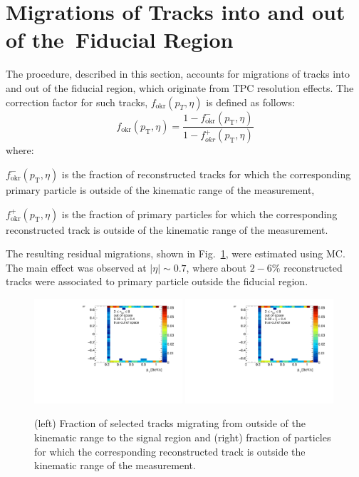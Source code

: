 \section{Migrations of Tracks into and out of the~Fiducial Region}\label{section:star_okr}
The procedure, described in this section, accounts for migrations of tracks into and out of the fiducial region, which originate from TPC resolution effects. The correction factor for such tracks, $f_\textrm{okr}(p_T, \eta)$ is defined as follows:
\begin{equation}
f_\textrm{okr}(p_\textrm{T}, \eta)=\frac{1-f_\textrm{okr}^-(p_\textrm{T}, \eta)}{1-f_{okr}^+(p_\textrm{T}, \eta)}
\end{equation}
where:
\begin{description}
	\item $f_\textrm{okr}^-(p_\textrm{T}, \eta)$ is the fraction of reconstructed tracks for which the corresponding primary particle is outside of the kinematic range of the measurement,
	\item $f_\textrm{okr}^+(p_\textrm{T}, \eta)$  is the fraction of primary particles for which the corresponding reconstructed track is outside of the kinematic range of the measurement.
\end{description}
The resulting residual migrations, shown in Fig.~\ref{fig:okr}, were estimated using MC. The main effect  was observed  at $|\eta| \sim 0.7$, where about $2-6\%$ reconstructed tracks were associated to primary particle outside the fiducial region.  

\begin{figure}[h!]
	\centering
	\includegraphics[width=0.49\textwidth, page=1]{chapters/chrgSTAR/img/OKR/outOfSpace.pdf}
	\includegraphics[width=0.49\textwidth, page=2]{chapters/chrgSTAR/img/OKR/outOfSpace.pdf}
	\caption{(left) Fraction of selected tracks migrating from outside of the kinematic range to the signal region and (right) fraction of particles for which the corresponding reconstructed track is outside the kinematic range of the measurement.}
	\label{fig:okr}
\end{figure}
\FloatBarrier